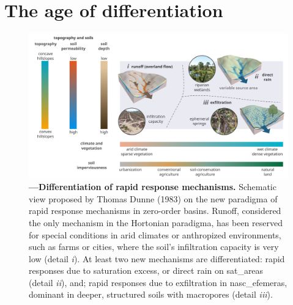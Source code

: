 \documentclass[./main_en.tex]{subfiles}
\begin{document}
\section{The age of differentiation}

\begin{figure}[t!] 
\centering				
\includegraphics[width=0.98\linewidth]{figs/fig_processes_en.jpg}		
\caption[Differentiation of rapid response mechanisms.]
{\textbf{---\;Differentiation of rapid response mechanisms.}
    Schematic view proposed by Thomas Dunne (1983) \cite{Dunne1983} on the new \gls{paradigma} of rapid response mechanisms in zero-order basins. Runoff, considered the only mechanism in the Hortonian \gls{paradigma}, has been reserved for special conditions in arid climates or anthropized environments, such as farms or cities, where the soil’s infiltration capacity is very low (detail \textrm{\textit{i}}). At least two new mechanisms are differentiated: rapid responses due to saturation excess, or direct rain on \gls{sat_areas} (detail \textrm{\textit{ii}}), and; rapid responses due to exfiltration in \gls{nasc_efemeras}, dominant in deeper, structured soils with macropores (detail \textrm{\textit{iii}}).
}
\label{fig:hydro:diff} 		
\end{figure}
\end{document}
